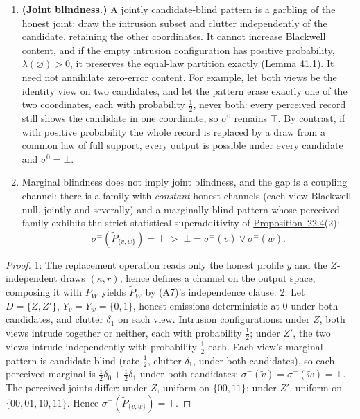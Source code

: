 \begin{thmplain}

\par\nopagebreak

\begin{enumerate}
\def\labelenumi{\arabic{enumi}.}
\tightlist
\item
  \textbf{(Joint blindness.)} A jointly candidate-blind pattern is a garbling of the honest joint: draw the intrusion subset and clutter independently of the candidate, retaining the other coordinates. It cannot increase Blackwell content, and if the empty intrusion configuration has positive probability, \(\lambda(\varnothing)>0\), it preserves the equal-law partition exactly (Lemma 41.1). It need not annihilate zero-error content. For example, let both views be the identity view on two candidates, and let the pattern erase exactly one of the two coordinates, each with probability \(\tfrac12\), never both: every perceived record still shows the candidate in one coordinate, so \(\sigma^0\) remains \(\top\). By contrast, if with positive probability the whole record is replaced by a draw from a common law of full support, every output is possible under every candidate and \(\sigma^0=\bot\).
\item
  Marginal blindness does not imply joint blindness, and the gap is a coupling channel: there is a family with \emph{constant} honest channels (each view Blackwell-null, jointly and severally) and a marginally blind pattern whose perceived family exhibits the strict statistical superadditivity of \hyperlink{stmt:22.4}{Proposition~22.4}(2):
  \[
  \sigma^{=}(\tilde P_{\{v,w\}}) = \top \;>\; \bot = \sigma^{=}(\tilde v) \vee \sigma^{=}(\tilde w).
  \]
\end{enumerate}
\end{thmplain}

\begin{proof}

1: The replacement operation reads only the honest profile \(y\) and the \(Z\)-independent draws \((\kappa, r)\), hence defines a channel on the output space; composing it with \(P_W\) yields \(\tilde P_W\) by (A7)'s independence clause. 2: Let \(D = \{Z, Z'\}\), \(Y_v = Y_w = \{0,1\}\), honest emissions deterministic at \(0\) under both candidates, and clutter \(\delta_1\) on each view. Intrusion configurations: under \(Z\), both views intrude together or neither, each with probability \(\tfrac12\); under \(Z'\), the two views intrude independently with probability \(\tfrac12\) each. Each view's marginal pattern is candidate-blind (rate \(\tfrac12\), clutter \(\delta_1\), under both candidates), so each perceived marginal is \(\tfrac12\delta_0 + \tfrac12\delta_1\) under both candidates: \(\sigma^=(\tilde v) = \sigma^=(\tilde w) = \bot\). The perceived joints differ: under \(Z\), uniform on \(\{00, 11\}\); under \(Z'\), uniform on \(\{00,01,10,11\}\). Hence \(\sigma^=(\tilde P_{\{v,w\}}) = \top\).
\end{proof}

